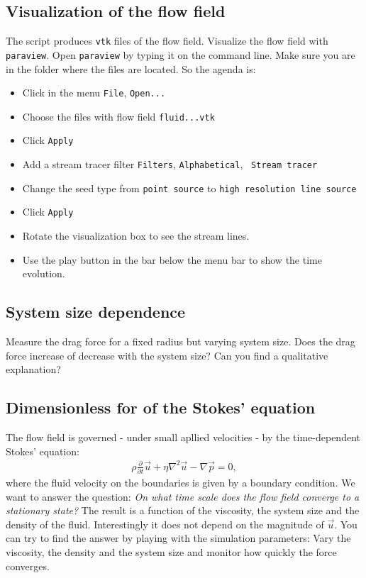 \subsection*{Visualization of the flow field}
The script produces {\tt vtk} files of the flow field. Visualize the flow field
with {\tt paraview}. Open {\tt paraview} by typing it on the command line. Make
sure you are in the folder where the files are located. So the agenda is:
\begin{itemize}
	\item Click in the menu {\tt File}, {\tt Open...}
	\item Choose the files with flow field {\tt fluid...vtk}
	\item Click {\tt Apply}
	\item Add a stream tracer filter {\tt Filters}, {\tt Alphabetical}, {\tt
		Stream tracer}
	\item Change the seed type from {\tt point source} to {\tt high resolution
		line source}
	\item Click {\tt Apply}
	\item Rotate the visualization box to see the stream lines.
	\item Use the play button in the bar below the menu bar to show the time
		evolution.
\end{itemize}

\subsection*{System size dependence}
Measure the drag force for a fixed radius but varying system size. Does the drag
force increase of decrease with the system size? Can you find a qualitative
explanation?

\subsection*{Dimensionless for of the Stokes' equation}
The flow field is governed - under small apllied velocities - by the
time-dependent Stokes' equation:
\begin{align*}
	\rho \frac{\partial}{\partial t}\vec{u}+\eta
	\nabla^2\vec{u}-\nabla\vec{p}=0,
\end{align*}
where the fluid velocity on the boundaries is given by a boundary condition. We
want to answer the question: \textit{On what time scale does the flow field
converge to a stationary state?} The result is a function of the viscosity, the
system size and the density of the fluid. Interestingly it does not depend on
the magnitude of $\vec{u}$. You can try to find the answer by playing with the
simulation parameters: Vary the viscosity, the density and the system size and
monitor how quickly the force converges.

